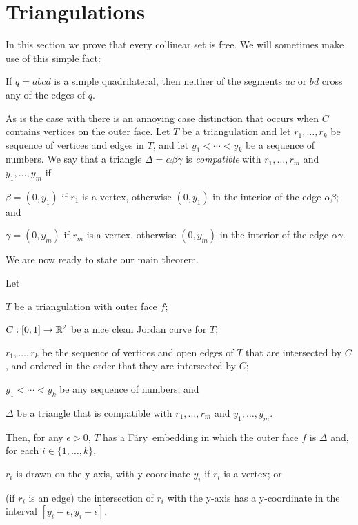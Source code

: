 \documentclass{patmorin}
\newcommand{\Fary}{Fáry}
\begin{document}
\section{Triangulations}

In this section we prove that every collinear set is free.
We will sometimes make use of this simple fact:
\begin{obs}
  If $q=abcd$ is a simple quadrilateral, then neither of the segments $ac$
  or $bd$ cross any of the edges of $q$.
\end{obs}

As is the case with  there is an annoying case distinction
that occurs when $C$ contains vertices on the outer face.  Let $T$
be a triangulation and let $r_1,\ldots,r_k$ be sequence of vertices
and edges in $T$, and let $y_1<\cdots<y_k$ be a sequence of numbers.
We say that a triangle $\Delta=\alpha\beta\gamma$ is \emph{compatible}
with $r_1,\ldots,r_m$ and $y_1,\ldots,y_m$ if
\begin{compactenum}
  \item $\beta=(0,y_1)$ if $r_1$ is a vertex, otherwise $(0, y_1)$ in the interior
  of the edge $\alpha\beta$; and
  \item $\gamma=(0,y_m)$ if $r_m$ is a vertex, otherwise $(0,y_m)$ in the interior
  of the edge $\alpha\gamma$.
\end{compactenum}

We are now ready to state our main theorem.

\begin{thm}
   Let
   \begin{compactenum}
     \item  $T$ be a triangulation with outer face $f$;
     \item  $C:[0,1]\to\mathbb{R}^2$ be a nice clean Jordan curve for $T$;
     \item $r_1,\ldots,r_k$ be the sequence of vertices and open edges
           of $T$ that are intersected by $C$, and ordered in the order
           that they are intersected by $C$;
     \item $y_1<\cdots<y_k$ be any sequence of numbers; and
     \item $\Delta$ be a triangle that is compatible with 
           $r_1,\ldots,r_m$ and $y_1,\ldots,y_m$.
  \end{compactenum}
   Then, for any $\epsilon>0$, $T$ has a
   \Fary\ embedding in which the outer face $f$ is $\Delta$
   and, for each $i\in\{1,\ldots,k\}$, 
   \begin{compactenum}
       \item $r_i$ is drawn on the y-axis, with y-coordinate $y_i$
         if $r_i$ is a vertex; or
       \item (if $r_i$ is an edge) the intersection of $r_i$ with the
         y-axis has a y-coordinate in the interval
         $[y_i-\epsilon,y_i+\epsilon]$.
   \end{compactenum}
\end{thm}
\end{document}

